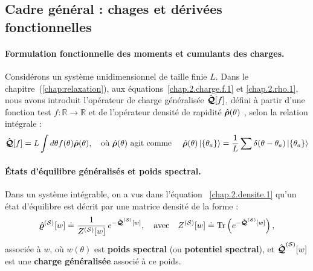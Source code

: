 \subsection{Cadre général : chages et dérivées fonctionnelles}


\begin{mdframed}[
	linewidth=0.5pt, 
	backgroundcolor=gray!5, 
	roundcorner=50pt,	
	innerleftmargin=5pt,
    innerrightmargin=5pt,
    innertopmargin=-10pt,
    innerbottommargin=2pt,
    leftmargin=2pt,
    rightmargin=2pt
	]
\paragraph{Formulation fonctionnelle des moments et cumulants des charges.}
Considérons un système unidimensionnel de taille finie $L$. 
Dans le chapitre~(\ref{chap:relaxation}), aux équations~\eqref{chap.2.charge.f.1} et \eqref{chap.2.rho.1}, nous avons introduit l’opérateur de charge généralisée $\hat{\bm{\mathcal{Q}}}[f]$, défini à partir d'une fonction test $f \colon \mathbb{R} \to \mathbb{R}$ et de l'opérateur densité de rapidité  $\hat{\bm{\rho}}(\theta)$ , selon la relation intégrale :
\begin{eqnarray}\label{chap4:eq.charge.q.1}
	\hat{\bm{\mathcal{Q}}}[f] = L\int d\theta f(\theta) \hat{\bm{\rho}}(\theta),\quad \text{où $\hat{\bm{\rho}}(\theta)$ agit comme } \quad \hat{\bm{\rho}}(\theta) \ket{ \{ \theta_a \} } = \frac{1}{L} \sum \delta ( \theta - \theta_a ) \ket{ \{ \theta_a \} }
\end{eqnarray}

\paragraph{États d'équilibre généralisés et poids spectral.}
Dans un système intégrable, on a vus dans l'équation ~\eqref{chap.2.densite.1} qu'un état d’équilibre est décrit par une matrice densité de la forme :
\begin{eqnarray}
	\hat{\bm{\varrho}}^{(\mathcal{S})}[w] \doteq  \frac{1}{Z^{(\mathcal{S})}[w]}\, e^{-\hat{\bm{\mathcal{Q}}}^{(\mathcal{S})}[w]},\quad \text{avec} \quad Z^{(\mathcal{S})}[w] \doteq \mathrm{Tr}\left(e^{-\hat{\bm{\mathcal{Q}}}^{(\mathcal{S})}[w]}\right),
\end{eqnarray}
associée à $w$, où \( w(\theta) \) est {\bf poids spectral} (ou {\bf potentiel spectral}), et   \( \hat{\bm{\mathcal{Q}}}^{(\mathcal{S})}[w] \) est une {\bf charge généralisée} associé à ce poids.
\end{mdframed}

